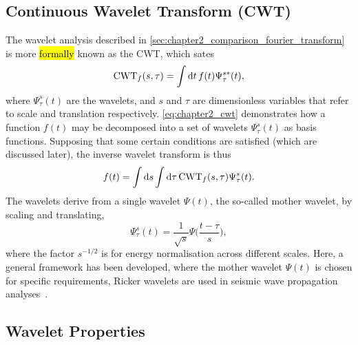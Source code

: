

\subsection{Continuous Wavelet Transform (CWT)}\label{sec:chapter2_continuous_wavelet_transform}

The wavelet analysis described in \cref{sec:chapter2_comparison_fourier_transform} is more \hl{formally} known as the CWT, which sates
%
\begin{equation}\label{eq:chapter2_cwt}
	\text{CWT}_{f}(s,\tau)
	= \int\dd{t} f(t) \Psi^{s\ast}_{\tau}(t),
\end{equation}
%
where \(\Psi^{s}_{\tau}(t)\) are the wavelets, and \(s\) and \(\tau{}\) are dimensionless variables that refer to scale and translation respectively.
\cref{eq:chapter2_cwt} demonstrates how a function \(f(t)\) may be decomposed into a set of wavelets \(\Psi^{s}_{\tau}(t)\) as basis functions.
Supposing that some certain conditions are satisfied (which are discussed later), the inverse wavelet transform is thus
%
\begin{equation}
	f(t)
	= \int\dd{s} \int\dd{\tau} \text{CWT}_{f}(s,\tau) \Psi^{s}_{\tau}(t).
\end{equation}
%
The wavelets derive from a single wavelet \(\Psi(t)\), the so-called mother wavelet, by scaling and translating, \ie{}
%
\begin{equation}\label{eq:chapter2_mother_wavelet}
	\Psi^{s}_{\tau}(t)
	= \frac{1}{\sqrt{s}} \Psi\bigg(\frac{t-\tau}{s}\bigg),
\end{equation}
%
where the factor \(s^{-1/2}\) is for energy normalisation across different scales.
Here, a general framework has been developed, where the mother wavelet \(\Psi(t)\) is chosen for specific requirements, \eg{} Ricker wavelets are used in seismic wave propagation analyses~\cite{Wang2014}.

\subsection{Wavelet Properties}


